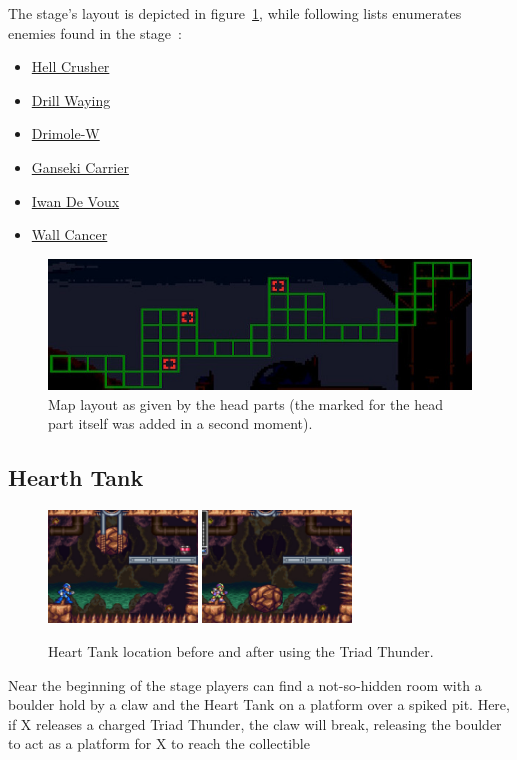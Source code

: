 The stage's layout is depicted in figure~\ref{fig:Quarry_map}, while following lists enumerates enemies found in the stage~\cite{wiki:Shipyard}:
\begin{itemize}
	\item \hyperlink{miniboss:Hell_Crusher}{Hell Crusher}
	\item \hyperlink{enem:Drill_Waying}{Drill Waying}
	\item \hyperlink{enem:Drimole-W}{Drimole-W}
	\item \hyperlink{enem:Ganseki_Carrier}{Ganseki Carrier}
	\item \hyperlink{enem:Iwan_De_Voux}{Iwan De Voux}
	\item \hyperlink{enem:Wall_Cancer}{Wall Cancer}
\end{itemize}

\begin{figure}[htp]
	\centering
	\includegraphics[width=.7\linewidth]{figures/X3/Tunnel_rhino/map.jpg}
	\caption{Map layout as given by the head parts (the marked for the head part itself was added in a second moment).}
	\label{fig:Quarry_map}
\end{figure}

\subsection{Hearth Tank}
\begin{figure}[htp]
	\centering
	\includegraphics[height=3cm]{figures/X3/Tunnel_rhino/heart_1.jpg}
	\includegraphics[height=3cm]{figures/X3/Tunnel_rhino/heart_2.jpg}
	\caption{Heart Tank location before and after using the Triad Thunder.}
\end{figure}
Near the beginning of the stage players can find a not-so-hidden room with a boulder hold by a claw and the Heart Tank on a platform over a spiked pit. Here, if X releases a charged Triad Thunder, the claw will break, releasing the boulder to act as a platform for X to reach the collectible


